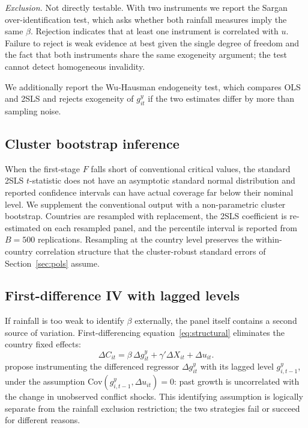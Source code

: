 \documentclass[11pt,a4paper]{article}
\begin{document}
\textit{Exclusion.} Not directly testable. With two instruments we
report the Sargan over-identification test, which asks whether both
rainfall measures imply the same $\beta$. Rejection indicates that at
least one instrument is correlated with $u$. Failure to reject is weak
evidence at best given the single degree of freedom and the fact that
both instruments share the same exogeneity argument; the test cannot
detect homogeneous invalidity.

We additionally report the Wu-Hausman endogeneity test, which compares
OLS and 2SLS and rejects exogeneity of $g^{y}_{it}$ if the two
estimates differ by more than sampling noise.

\subsection{Cluster bootstrap inference}\label{sec:boot}

When the first-stage $F$ falls short of conventional critical values,
the standard 2SLS $t$-statistic does not have an asymptotic standard
normal distribution and reported confidence intervals can have actual
coverage far below their nominal level. We supplement the conventional
output with a non-parametric cluster bootstrap. Countries are resampled
with replacement, the 2SLS coefficient is re-estimated on each
resampled panel, and the percentile interval is reported from $B=500$
replications. Resampling at the country level preserves the
within-country correlation structure that the cluster-robust standard
errors of Section~\ref{sec:pols} assume.

\subsection{First-difference IV with lagged levels}\label{sec:ahiv}

If rainfall is too weak to identify $\beta$ externally, the panel
itself contains a second source of variation. First-differencing
equation~\eqref{eq:structural} eliminates the country fixed effects:
\[
\Delta C_{it} = \beta\, \Delta g^{y}_{it} + \gamma' \Delta X_{it}
              + \Delta u_{it}.
\]
\citet{AndersonHsiao1981} propose instrumenting the differenced
regressor $\Delta g^{y}_{it}$ with its lagged level $g^{y}_{i,t-1}$,
under the assumption $\mathrm{Cov}(g^{y}_{i,t-1},\Delta u_{it}) = 0$:
past growth is uncorrelated with the change in unobserved conflict
shocks. This identifying assumption is logically separate from the
rainfall exclusion restriction; the two strategies fail or succeed for
different reasons.
\end{document}
